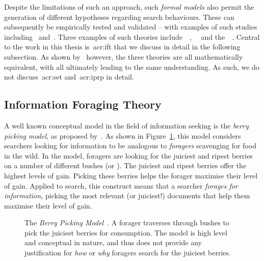 Despite the limitations of such an approach, such \emph{formal models} also permit the generation of different hypotheses regarding search behaviours. These can subsequently be empirically tested and validated -- with examples of such studies including~\cite{azzopardi2013query_cost} and~\cite{pirolli1996scatter_techniques}. Three examples of such theories include~~\citep{pirolli1999ift},~~\citep{azzopardi2011economics} and the~~\citep{fuhr2008iprp}. Central to the work in this thesis is~\gls{acr:ift} that we discuss in detail in the following subsection. As shown by~\cite{azzopardi2015theories} however, the three theories are all mathematically equivalent, with all ultimately leading to the same understanding. As such, we do not discuss~\gls{acr:set} and~\gls{acr:iprp} in detail.


\subsection{Information Foraging Theory}\label{sec:stopping_background:theoretical:ift}
A well known conceptual model in the field of information seeking is the \emph{berry picking model}, as proposed by~\cite{bates1989berry_picking}. As shown in Figure~\ref{fig:berry_picking}, this model considers searchers looking for information to be analogous to \emph{foragers} scavenging for food in the wild. In the model, foragers are looking for the juiciest and ripest berries on a number of different bushes (or \emph{}). The juiciest and ripest berries offer the highest levels of gain. Picking these berries helps the forager maximise their level of gain. Applied to search, this construct means that a searcher \emph{forages for information,} picking the most relevant (or juiciest!) documents that help them maximise their level of gain.

\begin{figure}[t!]
    \centering
    \caption[The Berry Picking Model~\cite{bates1989berry_picking}]{The \emph{Berry Picking Model}~\cite{bates1989berry_picking}. A forager traverses through bushes to pick the juiciest berries for consumption. The model is high level and conceptual in nature, and thus does not provide any justification for \emph{how} or \emph{why} foragers search for the juiciest berries.}
    \label{fig:berry_picking}
\end{figure}

